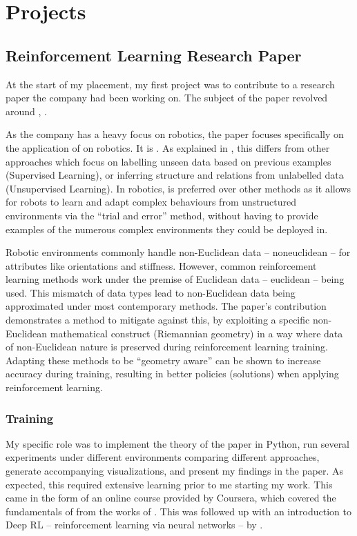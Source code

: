 \chapter{Projects}
\glsresetall

\section{Reinforcement Learning Research Paper}
\label{sec:research-paper}

At the start of my placement, my first project was to contribute to a research paper the company had
been working on. The subject of the paper revolved around , .

As the company has a heavy focus on robotics, the paper focuses specifically on the application of
 on robotics. It is . As explained in \textcite{sutton2018reinforcement}, this
differs from other  approaches which focus on labelling unseen data based on previous
examples (Supervised Learning), or inferring structure and relations from unlabelled data
(Unsupervised Learning). In robotics,  is preferred over other  methods as it
allows for robots to learn and adapt complex behaviours from unstructured environments via the
\enquote{trial and error} method, without having to provide examples of the numerous complex
environments they could be deployed in.

Robotic environments commonly handle non-Euclidean data -- \glsdesc*{noneuclidean} -- for attributes
like orientations and stiffness. However, common reinforcement learning methods work under the
premise of Euclidean data -- \glsdesc*{euclidean} -- being used. This mismatch of data types lead to
non-Euclidean data being approximated under most contemporary methods. The paper's contribution
demonstrates a method to mitigate against this, by exploiting a specific non-Euclidean mathematical
construct (Riemannian geometry) in a way where data of non-Euclidean nature is preserved during
reinforcement learning training. Adapting these methods to be \enquote{geometry aware} can be shown
to increase accuracy during training, resulting in better policies (solutions) when applying
reinforcement learning.

\subsection{Training}

My specific role was to implement the theory of the paper in Python, run several experiments under
different environments comparing different approaches, generate accompanying visualizations, and
present my findings in the paper. As expected, this required extensive learning prior to me starting
my work. This came in the form of an online course provided by Coursera, which covered the
fundamentals of  from the works of \textcite{sutton2018reinforcement}. This was followed up
with an introduction to Deep RL -- reinforcement learning via neural networks -- by
\textcite{openai2018spinningup}.

